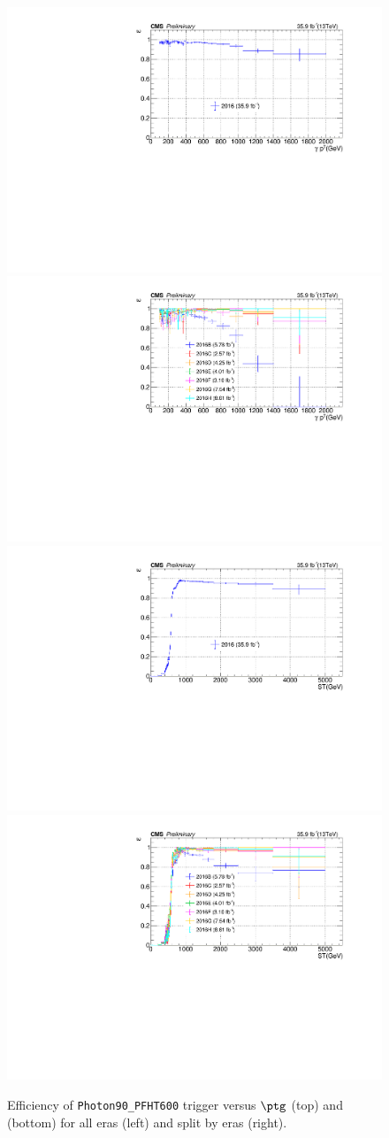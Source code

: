 \begin{figure}[htbp!]
  \centering
  \includegraphics[width=0.48\linewidth]{../Figures/Chap3/triggers/photon90_PFHT600_eff_versusPt_allEras.pdf}
  \includegraphics[width=0.48\linewidth]{../Figures/Chap3/triggers/photon90_PFHT600_eff_versusPt_versusEra.pdf}\\
  \includegraphics[width=0.48\linewidth]{../Figures/Chap3/triggers/photon90_PFHT600_eff_versusST_allEras.pdf}
  \includegraphics[width=0.48\linewidth]{../Figures/Chap3/triggers/photon90_PFHT600_eff_versusST_versusEra.pdf}
  \captionsetup{width=.9\linewidth}
  \caption{Efficiency of \texttt{Photon90\_PFHT600} trigger versus $\ptg$ (top) and \ST (bottom) for all eras (left) and split by eras (right).}
  \label{fig:photon90_ht600_eff}
\end{figure}

